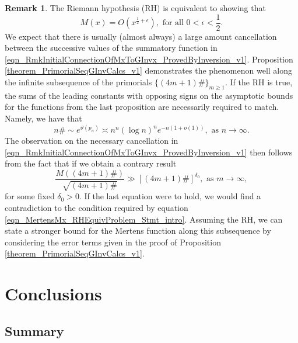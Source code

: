 \documentclass[11pt,reqno,a4letter]{article}
\newcommand{\hlocalref}[1]{\hyperref[#1]{\ref{#1}}}
\numberwithin{equation}{section}
\numberwithin{figure}{section}
\numberwithin{table}{section}
\theoremstyle{plain}
\numberwithin{theorem}{section}
\theoremstyle{definition}
\newtheorem{remark}[theorem]{Remark}
\begin{document}
\begin{remark}
\label{remark_LocalCancellationWithGxAlongThePrimorialsUnderTheRH} 
The Riemann hypothesis (RH) is equivalent to showing that 
\begin{equation} 
\label{eqn_MertensMx_RHEquivProblem_Stmt_intro} 
M(x) = O\left(x^{\frac{1}{2}+\epsilon}\right), \text{ for all } 0 < \epsilon < \frac{1}{2}.
\end{equation}
We expect that there is usually (almost always) 
a large amount cancellation between the successive 
values of the summatory function in 
\eqref{eqn_RmkInitialConnectionOfMxToGInvx_ProvedByInversion_v1}. 
Proposition \hlocalref{theorem_PrimorialSeqGInvCalcs_v1} 
demonstrates the phenomenon well along the infinite 
subsequence of the primorials $\{(4m+1)\#\}_{m \geq 1}$. 
If the RH is true, the sums of the leading constants with opposing signs 
on the asymptotic bounds for the functions from the last proposition 
are necessarily required to match. 
Namely, we have that 
\cite{DUSART-1999,DUSART-2010} 
\[
n\# \sim e^{\vartheta(p_n)} \asymp n^n (\log n)^n e^{-n(1+o(1))}, 
     \text{ as } n \rightarrow \infty. 
\]
The observation on the necessary cancellation in 
\eqref{eqn_RmkInitialConnectionOfMxToGInvx_ProvedByInversion_v1}
then follows from the fact that if we obtain a contrary result  
\[
\frac{M((4m+1)\#)}{\sqrt{(4m+1)\#}} \gg \left[(4m+1)\#\right]^{\delta_0}, 
     \text{ as } m \rightarrow \infty, 
\]
for some fixed $\delta_0 > 0$. 
If the last equation were to hold, we would find a contradiction to the 
condition required by equation \eqref{eqn_MertensMx_RHEquivProblem_Stmt_intro}. 
Assuming the RH, we can state a stronger bound for the 
Mertens function along this subsequence by considering the 
error terms given in the proof of 
Proposition \hlocalref{theorem_PrimorialSeqGInvCalcs_v1}. 
\end{remark}

\section{Conclusions}

\subsection{Summary}
\end{document}
